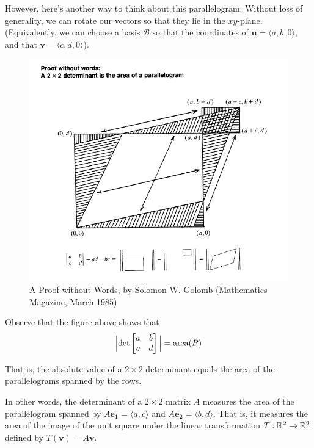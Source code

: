 However, here's another way to think about this parallelogram: Without loss of generality, we can rotate our vectors so that they lie in the $xy$-plane.  (Equivalently, we can choose a basis $\mathcal{B}$ so that the coordinates of $\bm{u} = \langle a, b, 0 \rangle$, and that $\bm{v} = \langle c, d, 0 \rangle$).

\begin{figure}[H]
    \centering
    \includegraphics[scale=0.5]{images/2x2detproof.png}
    \caption{A Proof without Words, by Solomon W. Golomb (Mathematics Magazine, March 1985)}
\end{figure}

Observe that the figure above shows that \begin{equation*}
        \Big|\textnormal{det}\begin{bmatrix}
a & b \\
c & d
\end{bmatrix}\Big| = \textnormal{area}(P)
    \end{equation*}
    
       That is, the absolute value of a $2 \times 2$
determinant equals the area of the parallelograms spanned by the rows.  

In other words, the determinant of a $2 \times 2$ matrix $A$ measures the area of the parallelogram spanned by $A\bm{e_1} = \langle a, c \rangle $ and $A\bm{e_2} = \langle b, d \rangle$.   That is, it measures the area of the image of the unit square under the linear transformation $T: \mathbb{R}^2 \to \mathbb{R}^2$ defined by $T(\bm{v}) = A\bm{v}$.

